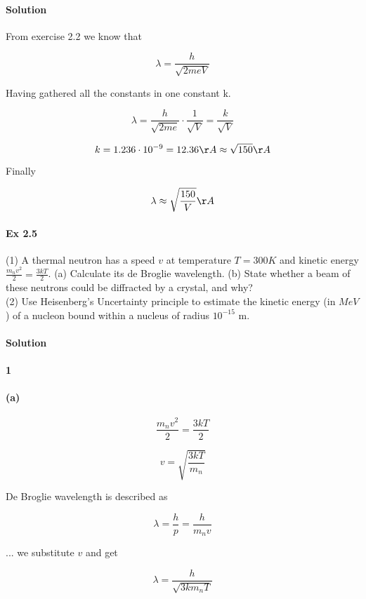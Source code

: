 \documentclass{article}
\begin{document}
\paragraph{Solution}

From exercise 2.2 we know that

\[\lambda = \frac{h}{\sqrt{2 m e V}}\]

Having gathered all the constants in one constant k.

\[\lambda = \frac{h}{\sqrt{2 m e}} \cdot \frac{1}{\sqrt{V}} = \frac{k}{\sqrt{V}}\]

\[k = 1.236 \cdot 10^{-9} = 12.36 \AA \approx \sqrt{150} \AA\]

Finally

\[\lambda \approx \sqrt{\frac{150}{V}} \AA\]


\paragraph{Ex 2.5}
(1) A thermal neutron has a speed $v$ at temperature $T = 300K$ and kinetic energy $\frac{m_{n}v^2}{2} = \frac{3kT}{2}$. (a) Calculate its de Broglie wavelength. (b) State whether a beam of these neutrons could be diffracted by a crystal, and why?\\(2) Use Heisenberg's Uncertainty principle to estimate the kinetic energy (in $MeV$) of a nucleon bound within a nucleus of radius $10^{-15}$ m.
\paragraph{Solution}

\paragraph{1}

\paragraph{(a)}

\[\frac{m_n v^2}{2} = \frac{3kT}{2}\]

\[v = \sqrt{\frac{3kT}{m_n}}\]

De Broglie wavelength is described as

\[\lambda = \frac{h}{p} = \frac{h}{m_{n}v}\]

... we substitute $v$ and get

\[\lambda = \frac{h}{\sqrt{3km_{n}T}}\]
\end{document}
